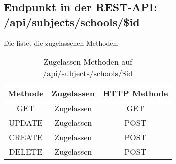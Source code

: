 \subsection{Endpunkt in der REST-API: /api/subjects/schools/\$id}
Die  listet die zugelassenen Methoden. 

\begin{table}[!htbp]
	\begin{tabular}{|c|c|c|}
		\hline
			\textbf{Methode} & \textbf{Zugelassen} & \textbf{HTTP Methode} \\ \hline
			GET & Zugelassen & GET \\ \hline
			UPDATE & Zugelassen & POST \\ \hline 
			CREATE & Zugelassen & POST \\ \hline 
			DELETE & Zugelassen & POST \\ \hline
	\end{tabular}

		\caption{Zugelassen Methoden auf /api/subjects/schools/\$id}
		\label{tab:end:rest:api:subjects:schools:id:meth}
\end{table}